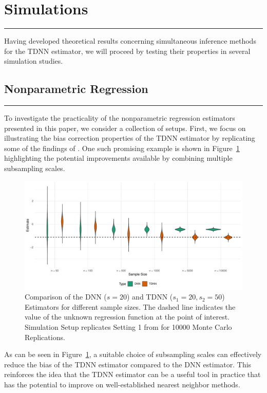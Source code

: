 \section{Simulations}\label{sec:simulations}
\hrule

Having developed theoretical results concerning simultaneous inference methods for the TDNN estimator, we will proceed by testing their properties in several simulation studies.

\subsection{Nonparametric Regression}
\hrule
To investigate the practicality of the nonparametric regression estimators presented in this paper, we consider a collection of setups.
First, we focus on illustrating the bias correction properties of the TDNN estimator by replicating some of the findings of \citet{demirkaya_optimal_2024}.
One such promising example is shown in Figure~\ref{fig:TDNN_bias_cor} highlighting the potential improvements available by combining multiple subsampling scales.
\begin{figure}[H]
	\centering
	\includegraphics[width = \textwidth]{../Code/Simulations/Graphics/TDNN_DNN.pdf}
	\caption{Comparison of the DNN ($s = 20$) and TDNN ($s_1 = 20, s_2 = 50$) Estimators for different sample sizes.
		The dashed line indicates the value of the unknown regression function at the point of interest.
		Simulation Setup replicates Setting 1 from \citet{demirkaya_optimal_2024} for 10000 Monte Carlo Replications.}
	\label{fig:TDNN_bias_cor}
\end{figure}
As can be seen in Figure~\ref{fig:TDNN_bias_cor}, a suitable choice of subsampling scales can effectively reduce the bias of the TDNN estimator compared to the DNN estimator.
This reinforces the idea that the TDNN estimator can be a useful tool in practice that has the potential to improve on well-established nearest neighbor methods.

